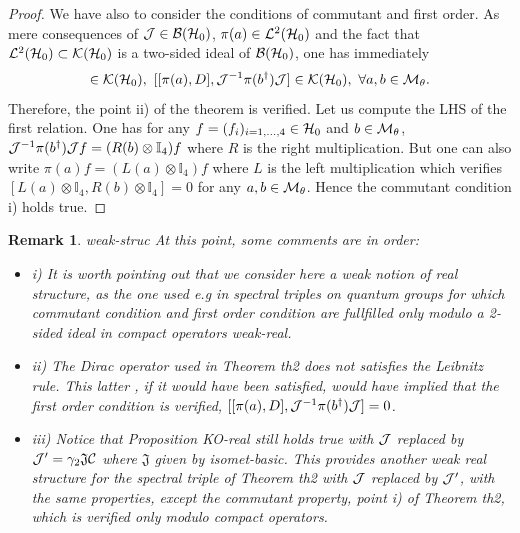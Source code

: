 \documentclass[10pt]{book}
\theoremstyle{break}
\newtheorem{remark}{Remark}
\begin{document}
\begin{proof}
We have also to consider the conditions of commutant and first order. As mere consequences of ${\cal{J}}\in{\cal{B}}({\cal{H}}_0)$, $\pi(a)\in{\cal{L}}^2({\cal{H}}_0)$ and the fact that ${\cal{L}}^2({\cal{H}}_0)\subset{\cal{K}}({\cal{H}}_0)$ is a two-sided ideal of ${\cal{B}}({\cal{H}}_0)$, one has immediately
\begin{equation*}
[\pi(a),{\cal{J}}^{-1}\pi(b^\dag){\cal{J}}]\in{\cal{K}}({\cal{H}}_0),\ [[\pi(a),D],{\cal{J}}^{-1}\pi(b^\dag){\cal{J}}]\in{\cal{K}}({\cal{H}}_0),\ \forall 
a,b\in{\cal{M}}_\theta.
\end{equation*}
Therefore, the point ii) of the theorem is verified. Let us compute the LHS of the first relation. One has for any $f=(f_i)_{i=1,...,4}\in{\cal{H}}_0$ and $b\in{\cal{M}}_\theta$,  ${\cal{J}}^{-1}\pi(b^\dag){\cal{J}}f=(R(b)\otimes\mathbb{I}_4)f$ where $R$ is the right multiplication. But one can also write $\pi(a) f=(L(a)\otimes\mathbb{I}_4)f$ where $L$ is the left multiplication which verifies $[L(a)\otimes\mathbb{I}_4,R(b)\otimes\mathbb{I}_4]=0$ for any $a,b\in{\cal{M}}_\theta$. Hence the commutant condition i) holds true.
\end{proof}
\begin{remark}{weak-struc} At this point, some comments are in order:
\begin{itemize}
\vspace*{-4pt}
\setlength{\itemsep}{-1pt}
\item i) It is worth pointing out that we consider here a weak notion of real structure, as the one used e.g in spectral triples on quantum groups for which commutant condition and first order condition are fullfilled only modulo a 2-sided ideal in compact operators {weak-real}.
\item ii) The Dirac operator used in Theorem {th2} does not satisfies the Leibnitz rule. This latter , if it would have been satisfied, would have implied that the first order condition is verified, $[[\pi(a),D],{\cal{J}}^{-1}\pi(b^\dag){\cal{J}}]=0$.
\item iii) Notice that Proposition {KO-real} still holds true with ${\cal{J}}$ replaced by ${\cal{J}}^\prime=\gamma_2\mathfrak{J}{\cal{C}} $ where $\mathfrak{J}$ given by {isomet-basic}. This provides another weak real structure for the spectral triple of 
Theorem {th2} with ${\cal{J}}$ replaced by ${\cal{J}}^\prime$, with the same properties, except the commutant property, point i) of Theorem {th2}, which is verified only modulo compact operators.
\end{itemize}
\end{remark}
\end{document}
